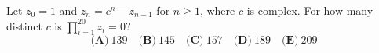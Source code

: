 Let $z_0=1$ and $z_n=c^n-z_{n-1}$ for $n\ge1$, where $c$ is complex. For how many distinct $c$ is $\prod_{i=1}^{20}z_i=0$?
\[\textbf{(A)}~139\quad\textbf{(B)}~145\quad\textbf{(C)}~157\quad\textbf{(D)}~189\quad\textbf{(E)}~209\]
